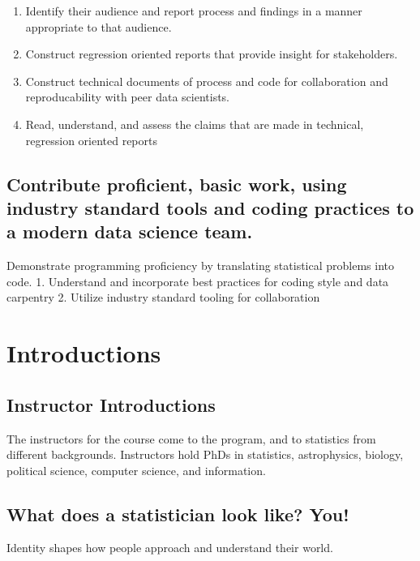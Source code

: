 \documentclass[
]{book}
\providecommand{\tightlist}{%
  \setlength{\itemsep}{0pt}\setlength{\parskip}{0pt}}
\theoremstyle{definition}
\theoremstyle{definition}
\theoremstyle{definition}
\theoremstyle{definition}
\theoremstyle{remark}
\begin{document}
\begin{enumerate}
\def\labelenumi{\arabic{enumi}.}
\tightlist
\item
  Identify their audience and report process and findings in a manner appropriate to that audience.
\item
  Construct regression oriented reports that provide insight for stakeholders.
\item
  Construct technical documents of process and code for collaboration and reproducability with peer data scientists.
\item
  Read, understand, and assess the claims that are made in technical, regression oriented reports
\end{enumerate}

\subsection{Contribute proficient, basic work, using industry standard tools and coding practices to a modern data science team.}\label{contribute-proficient-basic-work-using-industry-standard-tools-and-coding-practices-to-a-modern-data-science-team.}

Demonstrate programming proficiency by translating statistical problems into code.
1. Understand and incorporate best practices for coding style and data carpentry
2. Utilize industry standard tooling for collaboration

\section{Introductions}\label{introductions}

\subsection{Instructor Introductions}\label{instructor-introductions}

The instructors for the course come to the program, and to statistics from different backgrounds. Instructors hold PhDs in statistics, astrophysics, biology, political science, computer science, and information.

\subsection{What does a statistician look like? You!}\label{what-does-a-statistician-look-like-you}

Identity shapes how people approach and understand their world.
\end{document}
